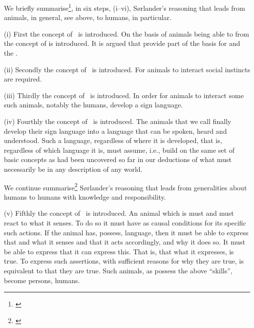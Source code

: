 \label{filo:Humans}

\begynd
\pind We briefly summarise\footnote{\cite[]{kaisorlander2016}}, in six steps, (i--vi), S{\o}rlander's reasoning
      \nyl that leads from animals, in general, see above, to humans,
      in particular. 
    
\begynd
\pind (i) First the concept of 
      \ is introduced.
\begynd
\pind On the basis of animals being able to  from 
\pind the concept of  is introduced.
\pind It is argued that   \nyl
      provide part of the basis for  and the
      . 
\afslut

\pind (ii) Secondly the concept of 
      \ is introduced.
\begynd
\pind For animals to interact social instincts are required.
\afslut
\mnewfoil

\pind (iii) Thirdly the concept of 
      \ is introduced.
\begynd
\pind In order for animals to interact some such animals, \nyl notably the
      humans, develop a sign language.
\afslut
      
\pind (iv) Fourthly the concept of 
      \ is introduced.
\begynd
\pind The animals that we call  finally develop their
      sign language into a language that can be spoken, heard and understood.
      \pind Such a language, regardless of where it is developed, \nyl
      that is, regardless of which language it is, \nyl
      must assume, i.e., build on the same set of basic concepts \nyl
      as had been uncovered so far in our deductions of what must
      necessarily be in any description of any world.
\afslut
\afslut
\afslut
\mnewfoil

\begynd
\pind We continue  summarise\footnote{\cite[]{kaisorlander2016}} S{\o}rlander's reasoning
      \nyl that leads from generalities about humans to 
      humans with knowledge and responsibility.
      
\begynd
\pind  (v) Fifthly the concept of 
      \ is introduced.
\begynd
\pind An animal which is  must  \nyl
      and must react to what it senses.
\pind To do so it must have  as causal conditions
      for its specific such actions.
\pind If the animal has, possess, language, then it must be able to
      express that and what it senses and that it acts accordingly,
      and why it does so. 
\pind It must be able to express that it can express this.
\pind That is, that what it expresses, is true.
\pind To express such assertions, with sufficient reasons for why they
      are true, is equivalent to  that they are true.
\afslut
\pind Such animals, as possess the above ``skills'', become persons, humans.
\afslut
\mnewfoil

